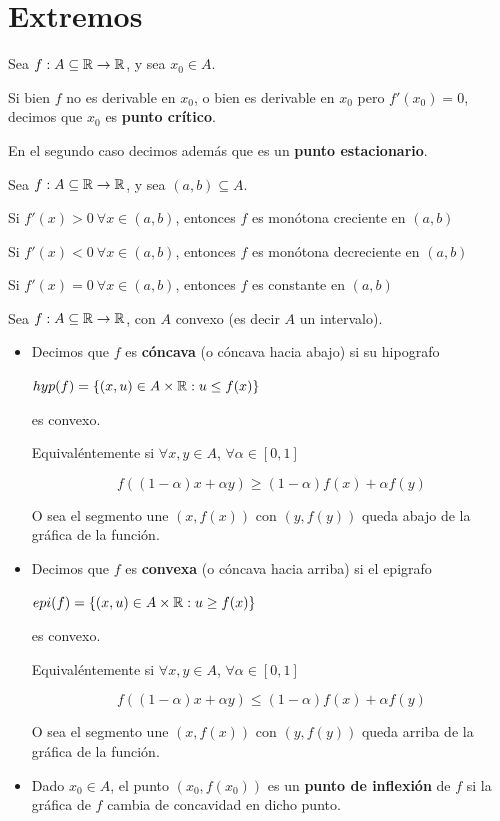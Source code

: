 \section{Extremos}

\begin{definition}[Crítico] \label{punto_critico_estacionario}
Sea $f : A \subseteq \mathbb{R} \to \mathbb{R}$, y sea $x_0 \in A$.

Si bien $f$ no es derivable en $x_0$, o bien es derivable en $x_0$ pero $f'(x_0) = 0$, decimos que $x_0$ es \textbf{punto crítico}.

En el segundo caso decimos además que es un \textbf{punto estacionario}.
\end{definition}

\begin{theorem}[Crecimiento]
Sea $f : A \subseteq \mathbb{R} \to \mathbb{R}$, y sea $(a,b) \subseteq A$.

Si $f'(x) > 0 \ \forall x \in (a,b)$, entonces $f$ es monótona creciente en $(a,b)$

Si $f'(x) < 0 \ \forall x \in (a,b)$, entonces $f$ es monótona decreciente en $(a,b)$

Si $f'(x) = 0 \ \forall x \in (a,b)$, entonces $f$ es constante en $(a,b)$
\end{theorem}

\begin{definition}[Concavidad]
Sea $f : A \subseteq \mathbb{R} \to \mathbb{R}$, con $A$ convexo (es decir $A$ un intervalo).

\begin{itemize}
\item Decimos que $f$ es \textbf{cóncava} (o cóncava hacia abajo) si su hipografo

$hyp(f) = \{ (x,u) \in A \times \mathbb{R} : u \leq f(x) \}$

es convexo.  

Equivaléntemente si $\forall x,y \in A$, $\forall \alpha \in [0,1]$

$$ f((1-\alpha)x + \alpha y) \geq (1-\alpha)f(x) + \alpha f(y) $$

O sea el segmento une $(x,f(x))$ con $(y,f(y))$ queda abajo de la gráfica de la función.

\item Decimos que $f$ es \textbf{convexa} (o cóncava hacia arriba) si el epigrafo

$epi(f) = \{ (x,u) \in A \times \mathbb{R} : u \geq f(x) \}$

es convexo.

Equivaléntemente si $\forall x,y \in A$, $\forall \alpha \in [0,1]$

$$ f((1-\alpha)x + \alpha y) \leq (1-\alpha)f(x) + \alpha f(y) $$

O sea el segmento une $(x,f(x))$ con $(y,f(y))$ queda arriba de la gráfica de la función.

\item Dado $x_0 \in A$, el punto $(x_0, f(x_0))$ es un \textbf{punto de inflexión} de $f$ si la gráfica de $f$ cambia de concavidad en dicho punto.
\end{itemize}
\end{definition}

